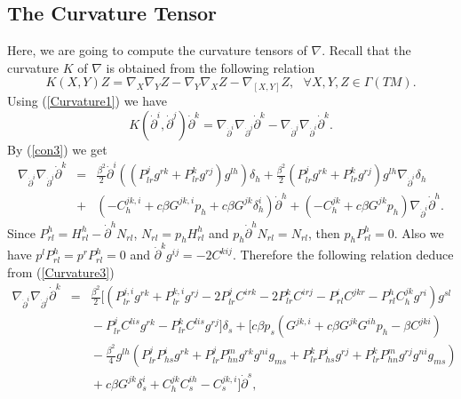 \documentclass[10pt,a4paper]{article}
\theoremstyle{plain}
\theoremstyle{definition}
\begin{document}
\subsection{The Curvature Tensor}
Here, we are going to compute the curvature tensors of $\nabla$. Recall that the curvature
$K$ of $\nabla$ is obtained from the following relation
\begin{equation}
K(X,Y)Z={\nabla }_{X} {\nabla }_{Y} Z-{\nabla }_{Y}{\nabla }_{X}
Z-{\nabla }_{[X,Y]} Z,\ \ \  \forall
X,Y,Z\in\Gamma(TM).\label{Curvature1}
\end{equation}
Using (\ref{Curvature1}) we have
\begin{equation}
K({\dot{\partial}}^i,{\dot{\partial}}^j){\dot{\partial}}^k={\nabla
}_{{\dot{\partial}}^i} {\nabla
}_{{\dot{\partial}}^j}{\dot{\partial}}^k-{\nabla
}_{{\dot{\partial}}^j}{\nabla
}_{{\dot{\partial}}^i}{\dot{\partial}}^k .\label{Curvature2}
\end{equation}
By  (\ref{con3}) we get
\begin{eqnarray}
\nabla_{{\dot{\partial}}^i}\nabla_{{\dot{\partial}}^j}{\dot{\partial}}^k\!\!\!\!&=&\!\!\!\!
\frac{\beta^2}{2}{\dot{\partial}}^i((P^j_{lr}g^{rk}+P^k_{lr}g^{rj})g^{lh})\delta_h
+\frac{\beta^2}{2}(P^j_{lr}g^{rk}+P^k_{lr}g^{rj})g^{lh}\nabla_{{\dot{\partial}}^i}\delta_h\nonumber\\
\!\!\!\!&+&\!\!\!\!(-C^{jk,i}_h+c\beta G^{jk,i}p_h+c\beta
G^{jk}\delta^i_h){\dot{\partial}}^h+(-C^{jk}_h+c\beta
G^{jk}p_h)\nabla_{{\dot{\partial}}^i}{\dot{\partial}}^h.
\label{Curvature3}
\end{eqnarray}
Since $P^h_{rl}=H^h_{rl}-{\dot{\partial}}^hN_{rl}$,
$N_{rl}=p_hH^h_{rl}$ and $p_h{\dot{\partial}}^hN_{rl}=N_{rl}$, then
$p_hP^h_{rl}=0$. Also we have $p^lP^h_{rl}=p^rP^h_{rl}=0$ and
${\dot{\partial}}^kg^{ij}=-2C^{kij}$. Therefore the following
relation deduce from (\ref{Curvature3})
\begin{eqnarray}
\nabla_{{\dot{\partial}}^i}\nabla_{{\dot{\partial}}^j}{\dot{\partial}}^k\!\!\!\!&=&\!\!\!\!
\frac{\beta^2}{2}\Big[(P^{j,i}_{lr}g^{rk}+P^{k,i}_{lr}g^{rj}-2P^j_{lr}C^{irk}-2P^k_{lr}C^{irj}
-P^i_{rl}C^{jkr}-P^h_{rl}C^{jk}_hg^{ri})g^{sl}
\nonumber\\
\!\!\!\!&&\!\!\!\!-P^j_{lr}C^{lis}g^{rk}
-P^k_{lr}C^{lis}g^{rj}\Big]\delta_s
+\Big[c\beta p_s(G^{jk,i}+c\beta G^{jk}G^{ih}p_h-\beta C^{jki})\nonumber\\
\!\!\!\!&&\!\!\!\!
-\frac{\beta^2}{4}g^{lh}(P^j_{lr}P^i_{hs}g^{rk}+P^j_{lr}P^m_{hn}g^{rk}g^{ni}g_{ms}+P^k_{lr}P^i_{hs}g^{rj}+P^k_{lr}P^m_{hn}g^{rj}g^{ni}g_{ms})
\nonumber\\
\!\!\!\!&&\!\!\!\!+c\beta
G^{jk}\delta^i_s+C^{jk}_hC^{ih}_s-C^{jk,i}_s\Big]{\dot{\partial}}^s,\label{Curvature4}
\end{eqnarray}
\end{document}
